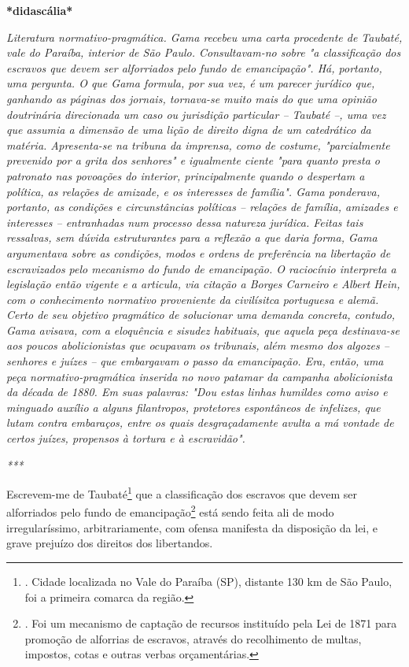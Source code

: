 \textbf{*didascália*}

\emph{Literatura normativo-pragmática. Gama recebeu uma carta procedente
de Taubaté, vale do Paraíba, interior de São Paulo. Consultavam-no sobre
"a classificação dos escravos que devem ser alforriados pelo fundo de
emancipação". Há, portanto, uma pergunta. O que Gama formula, por sua
vez, é um parecer jurídico que, ganhando as páginas dos jornais,
tornava-se muito mais do que uma opinião doutrinária direcionada um caso
ou jurisdição particular -- Taubaté --, uma vez que assumia a dimensão
de uma lição de direito digna de um catedrático da matéria. Apresenta-se
na tribuna da imprensa, como de costume, "parcialmente prevenido por a
grita dos senhores" e igualmente ciente "para quanto presta o patronato
nas povoações do interior, principalmente quando o despertam a política,
as relações de amizade, e os interesses de família". Gama ponderava,
portanto, as condições e circunstâncias políticas -- relações de
família, amizades e interesses -- entranhadas num processo dessa
natureza jurídica. Feitas tais ressalvas, sem dúvida estruturantes para
a reflexão a que daria forma, Gama argumentava sobre as condições, modos
e ordens de preferência na libertação de escravizados pelo mecanismo do
fundo de emancipação. O raciocínio interpreta a legislação então vigente
e a articula, via citação a Borges Carneiro e Albert Hein, com o
conhecimento normativo proveniente da civilísitca portuguesa e alemã.
Certo de seu objetivo pragmático de solucionar uma demanda concreta,
contudo, Gama avisava, com a eloquência e sisudez habituais, que aquela
peça destinava-se aos poucos abolicionistas que ocupavam os tribunais,
além mesmo dos algozes -- senhores e juízes -- que embargavam o passo da
emancipação. Era, então, uma peça normativo-pragmática inserida no novo
patamar da campanha abolicionista da década de 1880. Em suas palavras:
"Dou estas linhas humildes como aviso e minguado auxílio a alguns
filantropos, protetores espontâneos de infelizes, que lutam contra
embaraços, entre os quais desgraçadamente avulta a má vontade de certos
juízes, propensos à tortura e à escravidão".}

\emph{***}

Escrevem-me de Taubaté\footnote{. Cidade localizada no Vale do Paraíba
  (SP), distante 130 km de São Paulo, foi a primeira comarca da região.}
que a classificação dos escravos que devem ser alforriados pelo fundo de
emancipação\footnote{. Foi um mecanismo de captação de recursos
  instituído pela Lei de 1871 para promoção de alforrias de escravos,
  através do recolhimento de multas, impostos, cotas e outras verbas
  orçamentárias.} está sendo feita ali de modo irregularíssimo,
arbitrariamente, com ofensa manifesta da disposição da lei, e grave
prejuízo dos direitos dos libertandos.

